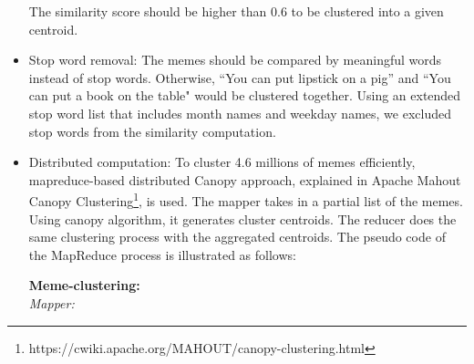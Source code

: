 \documentclass{sig-alternate}
\begin{document}
\begin{itemize}
The similarity score should be higher than 0.6 to be clustered into a given centroid.
 
 \item Stop word removal: The memes should be compared by meaningful words instead of stop words. Otherwise, ``You can put lipstick on a pig'' and ``You can put a book on the table" would be clustered together. Using an extended stop word list that includes month names and weekday names, we excluded stop words from the similarity computation. 
 \item Distributed computation: To cluster 4.6 millions of memes efficiently, mapreduce-based distributed Canopy approach, explained in Apache Mahout Canopy Clustering\footnote{https://cwiki.apache.org/MAHOUT/canopy-clustering.html}, is used. The mapper takes in a partial list of the memes. Using canopy algorithm, it generates cluster centroids. The reducer does the same clustering process with the aggregated centroids. The pseudo code of the MapReduce process is illustrated as follows:
 

\begin{centering}
\begin{tabbing}
\textbf{Meme-clustering:}\\
\emph{Mapper:}\\


\end{tabbing}
\end{centering}
\end{itemize}
\end{document}
